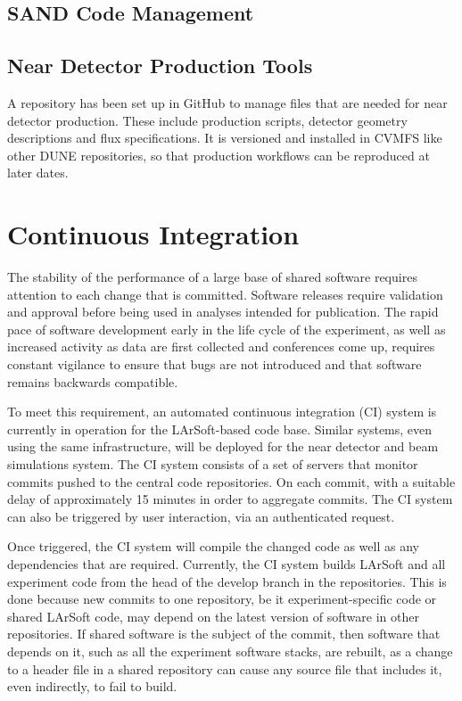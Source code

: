 \documentclass[../main-v1.tex]{subfiles}
\begin{document}
\subsection{SAND Code Management}
\label{sec:codemgmt:sand}

\subsection{Near Detector Production Tools}
\label{sec:codemgmt:ndproduction}

A repository has been set up in GitHub to manage files that are needed for near detector production.  These include production scripts, detector geometry descriptions and flux specifications.  It is versioned and installed in CVMFS like other DUNE repositories, so that production workflows can be reproduced at later dates.

\section{Continuous Integration }
\label{sec:codemgmt:ci}

The stability of the performance of a large base of shared software requires attention to each change that is committed.  Software releases require validation and approval before being used in analyses intended for publication.  The rapid pace of software development early in the life cycle of the experiment, as well as increased activity as data are first collected and conferences come up, requires constant vigilance to ensure that bugs are not introduced and that software remains backwards compatible.

To meet this requirement, an automated continuous integration (CI) system is currently in operation for the LArSoft-based code base.  Similar systems, even using the same infrastructure, will be deployed for the near detector and beam simulations system.  The CI system consists of a set of servers that monitor commits pushed to the central code repositories.  On each commit, with a suitable delay of approximately 15 minutes in order to aggregate commits.  The CI system can also be triggered by user interaction, via an authenticated request.

Once triggered, the CI system will compile the changed code as well as any dependencies that are required.  Currently, the CI system builds LArSoft and all experiment code from the head of the develop branch in the repositories.  This is done because new commits to one repository, be it experiment-specific code or shared LArSoft code, may depend on the latest version of software in other repositories.  If shared software is the subject of the commit, then software that depends on it, such as all the experiment software stacks, are rebuilt, as a change to a header file in a shared repository can cause any source file that includes it, even indirectly, to fail to build.
\end{document}
